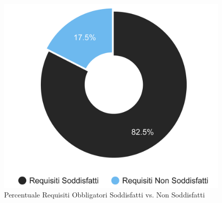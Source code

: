 \begin{figure}[H]
    \centering
    \includegraphics[scale=0.7]{Contenuto/Immagini/ReqObbligatoriSodd.png}
    \caption{Percentuale Requisiti Obbligatori Soddisfatti vs. Non Soddisfatti}
\end{figure}